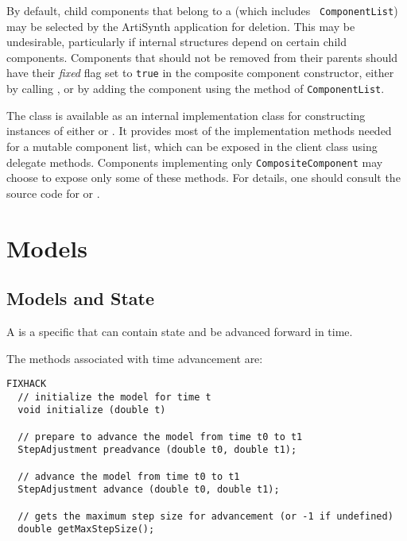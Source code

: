 \documentclass{article}
\begin{document}
\begin{sideblock}
By default, child components that belong to a
 (which includes {\tt
ComponentList}) may be selected by the ArtiSynth application for deletion.
This may be undesirable, particularly if internal structures
depend on certain child components.
Components that should not
be removed from their parents should
have their {\it fixed} flag set to {\tt true} in
the composite component constructor, either by calling
,
or by adding the component using the 
 method of {\tt ComponentList}.
\end{sideblock}

The class  is available as an internal
implementation class for constructing instances of either
 or
.  It provides most of the
implementation methods needed for a mutable component list, which can
be exposed in the client class using delegate methods.  Components
implementing only {\tt CompositeComponent} may choose to expose only
some of these methods. For details, one should consult the source code
for  or .


\section{Models}
\label{Models}

\subsection{Models and State}
\label{ModelsAndStateSec}

A  is a specific  that can
contain state and be advanced forward in time.

The methods associated with time advancement are:
\begin{lstlisting}FIXHACK
  // initialize the model for time t
  void initialize (double t)

  // prepare to advance the model from time t0 to t1
  StepAdjustment preadvance (double t0, double t1);

  // advance the model from time t0 to t1
  StepAdjustment advance (double t0, double t1);

  // gets the maximum step size for advancement (or -1 if undefined)
  double getMaxStepSize();
\end{lstlisting}
\end{document}
